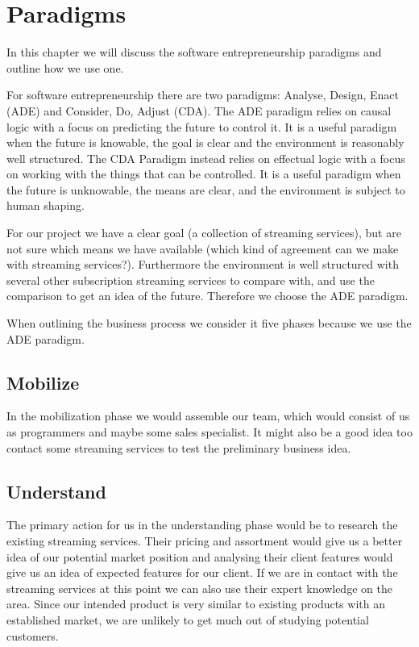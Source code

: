 \section{Paradigms}
\label{sec:paradigms}
In this chapter we will discuss the software entrepreneurship paradigms and outline how we use one.

For software entrepreneurship there are two paradigms: Analyse, Design, Enact (ADE) and Consider, Do, Adjust (CDA).
The ADE paradigm relies on causal logic with a focus on predicting the future to control it.
It is a useful paradigm when the future is knowable, the goal is clear and the environment is reasonably well structured.
The CDA Paradigm instead relies on effectual logic with a focus on working with the things that can be controlled.
It is a useful paradigm when the future is unknowable, the means are clear, and the environment is subject to human shaping.

For our project we have a clear goal (a collection of streaming services), but are not sure which means we have available (which kind of agreement can we make with streaming services?).
Furthermore the environment is well structured with several other subscription streaming services to compare with, and use the comparison to get an idea of the future.
Therefore we choose the ADE paradigm.

When outlining the business process we consider it five phases because we use the ADE paradigm.

\subsection{Mobilize}
In the mobilization phase we would assemble our team, which would consist of us as programmers and maybe some sales specialist. It might also be a good idea too contact some streaming services to test the preliminary business idea.

\subsection{Understand}
The primary action for us in the understanding phase would be to research the existing streaming services. Their pricing and assortment would give us a better idea of our potential market position and analysing their client features would give us an idea of expected features for our client.
If we are in contact with the streaming services at this point we can also use their expert knowledge on the area.
Since our intended product is very similar to existing products with an established market, we are unlikely to get much out of studying potential customers.

